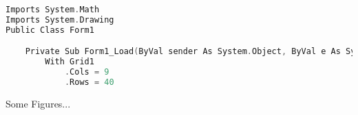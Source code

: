\begin{appendix}

\begin{lstlisting}[language = C]
Imports System.Math
Imports System.Drawing
Public Class Form1

    Private Sub Form1_Load(ByVal sender As System.Object, ByVal e As System.EventArgs) Handles MyBase.Load
        With Grid1
            .Cols = 9
            .Rows = 40
\end{lstlisting}

\end{appendix}



\begin{appendix}

Some Figures...

\end{appendix}